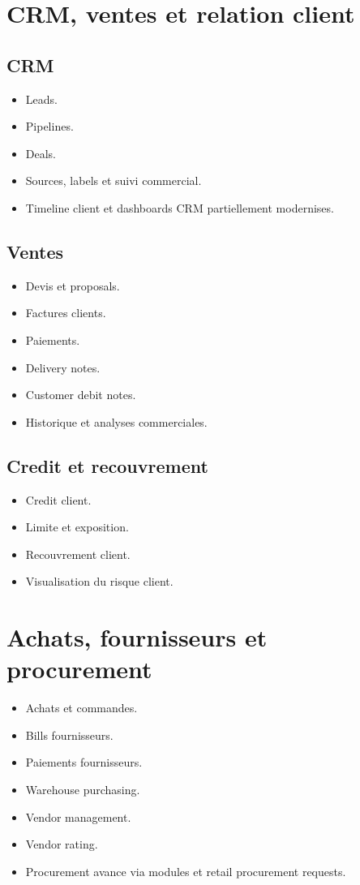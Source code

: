 \documentclass[11pt,a4paper]{article}
\begin{document}
\section{CRM, ventes et relation client}
\subsection{CRM}
\begin{itemize}[leftmargin=1.2cm]
    \item Leads.
    \item Pipelines.
    \item Deals.
    \item Sources, labels et suivi commercial.
    \item Timeline client et dashboards CRM partiellement modernises.
\end{itemize}

\subsection{Ventes}
\begin{itemize}[leftmargin=1.2cm]
    \item Devis et proposals.
    \item Factures clients.
    \item Paiements.
    \item Delivery notes.
    \item Customer debit notes.
    \item Historique et analyses commerciales.
\end{itemize}

\subsection{Credit et recouvrement}
\begin{itemize}[leftmargin=1.2cm]
    \item Credit client.
    \item Limite et exposition.
    \item Recouvrement client.
    \item Visualisation du risque client.
\end{itemize}

\section{Achats, fournisseurs et procurement}
\begin{itemize}[leftmargin=1.2cm]
    \item Achats et commandes.
    \item Bills fournisseurs.
    \item Paiements fournisseurs.
    \item Warehouse purchasing.
    \item Vendor management.
    \item Vendor rating.
    \item Procurement avance via modules et retail procurement requests.
\end{itemize}
\end{document}
